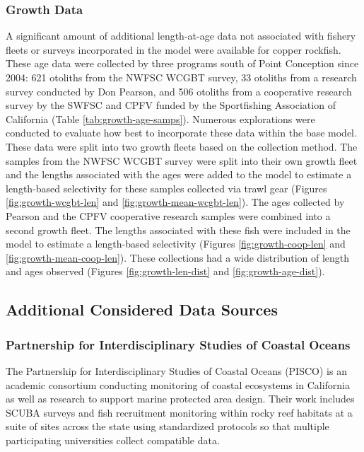 \documentclass[11pt,
  english,
  letterpaper,
]{article}
\begin{document}
\hypertarget{growth-data}{%
\subsubsection{Growth Data}\label{growth-data}}

A significant amount of additional length-at-age data not associated with fishery fleets or surveys incorporated in the model were available for copper rockfish. These age data were collected by three programs south of Point Conception since 2004: 621 otoliths from the NWFSC WCGBT survey, 33 otoliths from a research survey conducted by Don Pearson, and 506 otoliths from a cooperative research survey by the SWFSC and CPFV funded by the Sportfishing Association of California (Table \ref{tab:growth-age-samps}). Numerous explorations were conducted to evaluate how best to incorporate these data within the base model. These data were split into two growth fleets based on the collection method. The samples from the NWFSC WCGBT survey were split into their own growth fleet and the lengths associated with the ages were added to the model to estimate a length-based selectivity for these samples collected via trawl gear (Figures \ref{fig:growth-wcgbt-len} and \ref{fig:growth-mean-wcgbt-len}). The ages collected by Pearson and the CPFV cooperative research samples were combined into a second growth fleet. The lengths associated with these fish were included in the model to estimate a length-based selectivity (Figures \ref{fig:growth-coop-len} and \ref{fig:growth-mean-coop-len}). These collections had a wide distribution of length and ages observed (Figures \ref{fig:growth-len-dist} and \ref{fig:growth-age-dist}).

\hypertarget{additional-considered-data-sources}{%
\subsection{Additional Considered Data Sources}\label{additional-considered-data-sources}}

\hypertarget{partnership-for-interdisciplinary-studies-of-coastal-oceans}{%
\subsubsection{Partnership for Interdisciplinary Studies of Coastal Oceans}\label{partnership-for-interdisciplinary-studies-of-coastal-oceans}}

The Partnership for Interdisciplinary Studies of Coastal Oceans (PISCO) is an academic consortium conducting monitoring of coastal ecosystems in California as well as research to support marine protected area design. Their work includes SCUBA surveys and fish recruitment monitoring within rocky reef habitats at a suite of sites across the state using standardized protocols so that multiple participating universities collect compatible data.
\end{document}
